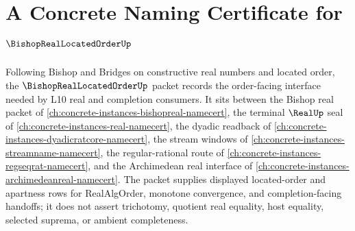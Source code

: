 \chapter{A Concrete Naming Certificate for $\BishopRealLocatedOrderUp$}
\label{ch:concrete-instances-bishop-real-located-order-namecert}

Following Bishop and Bridges on constructive real numbers and located order, the $\BishopRealLocatedOrderUp$ packet records the order-facing interface needed by L10 real and completion consumers. It sits between the Bishop real packet of \autoref{ch:concrete-instances-bishopreal-namecert}, the terminal $\RealUp$ seal of \autoref{ch:concrete-instances-real-namecert}, the dyadic readback of \autoref{ch:concrete-instances-dyadicratcore-namecert}, the stream windows of \autoref{ch:concrete-instances-streamname-namecert}, the regular-rational route of \autoref{ch:concrete-instances-regseqrat-namecert}, and the Archimedean real interface of \autoref{ch:concrete-instances-archimedeanreal-namecert}. The packet supplies displayed located-order and apartness rows for RealAlgOrder, monotone convergence, and completion-facing handoffs; it does not assert trichotomy, quotient real equality, host equality, selected suprema, or ambient completeness.

